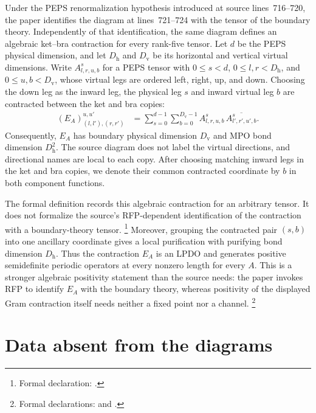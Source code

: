 \documentclass{article}
\begin{document}
Under the PEPS renormalization hypothesis introduced at source
lines~716--720, the paper identifies the diagram at lines~721--724 with the
tensor of the boundary theory. Independently of that identification, the same
diagram defines an algebraic ket--bra contraction for every rank-five tensor.
Let $d$ be the PEPS physical dimension, and let
$D_{\mathrm h}$ and $D_{\mathrm v}$ be its horizontal and vertical virtual
dimensions. Write $A^s_{l,r,u,b}$ for a PEPS tensor with
$0\leq s<d$, $0\leq l,r<D_{\mathrm h}$, and
$0\leq u,b<D_{\mathrm v}$, whose virtual legs are ordered left, right, up, and
down. Choosing the down leg as the inward leg, the physical leg $s$ and inward
virtual leg $b$ are contracted between the ket and bra copies:
\begin{align}
    (E_A)^{u,u'}_{(l,l'),(r,r')}
     & =
    \sum_{s=0}^{d-1}\sum_{b=0}^{D_{\mathrm v}-1}
    A^s_{l,r,u,b}\,
    \overline{A^s_{l',r',u',b}}.
    \label{eq:cpsv16_peps_boundary_rfp_specification_local_tensor}
\end{align}
Consequently, $E_A$ has boundary physical dimension $D_{\mathrm v}$ and MPO
bond dimension $D_{\mathrm h}^2$. The source diagram does not label the virtual
directions, and directional names are local to each copy. After choosing
matching inward legs in the ket and bra copies, we denote their common
contracted coordinate by $b$ in both component functions.

The formal definition records this algebraic contraction for an arbitrary
tensor. It does not formalize the source's RFP-dependent identification of the
contraction with a boundary-theory tensor.
\footnote{Formal declaration:
    .}
Moreover, grouping the contracted pair $(s,b)$ into one ancillary coordinate
gives a local purification with purifying bond dimension $D_{\mathrm h}$.
Thus the contraction $E_A$ is an LPDO and generates positive semidefinite
periodic operators at every nonzero length for every $A$. This is a stronger
algebraic positivity statement than the source needs: the paper invokes RFP to
identify $E_A$ with the boundary theory, whereas positivity of the displayed
Gram contraction itself needs neither a fixed point nor a channel.
\footnote{Formal declarations:
     and
    .}

\section{Data absent from the diagrams}
\end{document}
